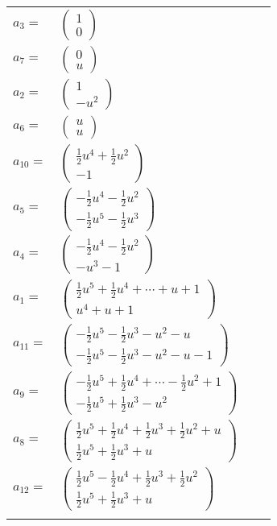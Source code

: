 \documentclass[1p]{elsarticle_modified}
\theoremstyle{definition}
\begin{document}
\begin{tabular}{m{7pt} m{180pt} m{7pt} m{180pt} }
\flushright $a_{3}=$&$\begin{pmatrix}1\\0\end{pmatrix}$ \\
\flushright $a_{7}=$&$\begin{pmatrix}0\\u\end{pmatrix}$ \\
\flushright $a_{2}=$&$\begin{pmatrix}1\\- u^2\end{pmatrix}$ \\
\flushright $a_{6}=$&$\begin{pmatrix}u\\u\end{pmatrix}$ \\
\flushright $a_{10}=$&$\begin{pmatrix}\frac{1}{2} u^4+\frac{1}{2} u^2\\-1\end{pmatrix}$ \\
\flushright $a_{5}=$&$\begin{pmatrix}-\frac{1}{2} u^4-\frac{1}{2} u^2\\-\frac{1}{2} u^5-\frac{1}{2} u^3\end{pmatrix}$ \\
\flushright $a_{4}=$&$\begin{pmatrix}-\frac{1}{2} u^4-\frac{1}{2} u^2\\- u^3-1\end{pmatrix}$ \\
\flushright $a_{1}=$&$\begin{pmatrix}\frac{1}{2} u^5+\frac{1}{2} u^4+\cdots+u+1\\u^4+u+1\end{pmatrix}$ \\
\flushright $a_{11}=$&$\begin{pmatrix}-\frac{1}{2} u^5-\frac{1}{2} u^3- u^2- u\\-\frac{1}{2} u^5-\frac{1}{2} u^3- u^2- u-1\end{pmatrix}$ \\
\flushright $a_{9}=$&$\begin{pmatrix}-\frac{1}{2} u^5+\frac{1}{2} u^4+\cdots-\frac{1}{2} u^2+1\\-\frac{1}{2} u^5+\frac{1}{2} u^3- u^2\end{pmatrix}$ \\
\flushright $a_{8}=$&$\begin{pmatrix}\frac{1}{2} u^5+\frac{1}{2} u^4+\frac{1}{2} u^3+\frac{1}{2} u^2+u\\\frac{1}{2} u^5+\frac{1}{2} u^3+u\end{pmatrix}$ \\
\flushright $a_{12}=$&$\begin{pmatrix}\frac{1}{2} u^5-\frac{1}{2} u^4+\frac{1}{2} u^3+\frac{1}{2} u^2\\\frac{1}{2} u^5+\frac{1}{2} u^3+u\end{pmatrix}$\\&\end{tabular}
\end{document}
